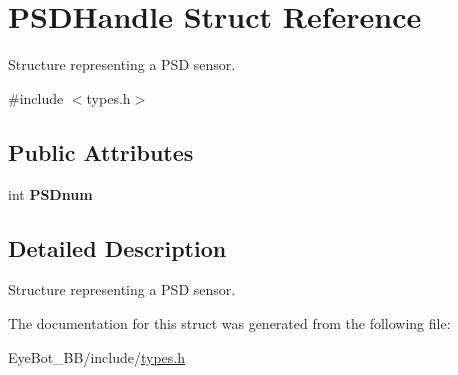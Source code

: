 \hypertarget{struct_p_s_d_handle}{\section{\-P\-S\-D\-Handle \-Struct \-Reference}
\label{struct_p_s_d_handle}
}


\-Structure representing a \-P\-S\-D sensor.  




{\ttfamily \#include $<$types.\-h$>$}

\subsection*{\-Public \-Attributes}
\begin{DoxyCompactItemize}
\item 
\hypertarget{struct_p_s_d_handle_a95974b27c2f16155f9786b8dff72e031}{int {\bfseries \-P\-S\-Dnum}}\label{struct_p_s_d_handle_a95974b27c2f16155f9786b8dff72e031}

\end{DoxyCompactItemize}


\subsection{\-Detailed \-Description}
\-Structure representing a \-P\-S\-D sensor. 

\-The documentation for this struct was generated from the following file\-:\begin{DoxyCompactItemize}
\item 
\-Eye\-Bot\-\_\-\-B\-B/include/\hyperlink{types_8h}{types.\-h}\end{DoxyCompactItemize}
